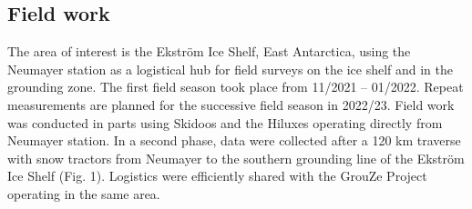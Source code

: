 \documentclass[a4paper,12pt]{article}
\begin{document}
\subsection{Field work}
The area of interest is the Ekström Ice Shelf, East Antarctica, using the Neumayer station as a logistical hub for field surveys on the ice shelf and in the grounding zone. The first field season took place from 11/2021 – 01/2022. Repeat measurements are planned for the successive field season in 2022/23. 
Field work was conducted in parts using Skidoos and the Hiluxes operating directly from Neumayer station. In a second phase, data were collected after a 120 km traverse with snow tractors from Neumayer to the southern grounding line of the Ekström Ice Shelf (Fig. 1). Logistics were efficiently shared with the GrouZe Project operating in the same area.

\pagebreak
\end{document}
